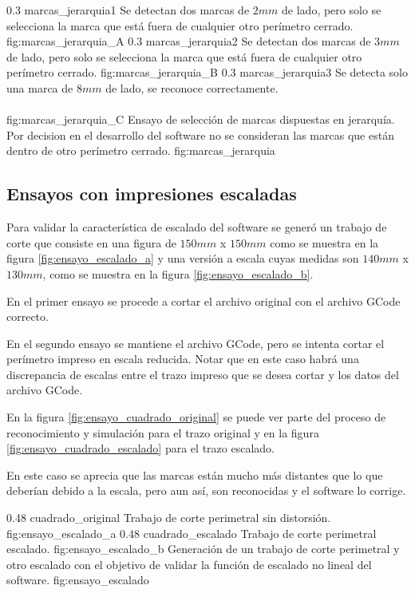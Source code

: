    \subfigabc
   {0.3} {marcas_jerarquia1} {Se detectan dos marcas de $2 mm$ de lado, pero solo se selecciona la marca que está fuera de cualquier otro perímetro cerrado.} {fig:marcas_jerarquia_A}
   {0.3} {marcas_jerarquia2} {Se detectan dos marcas de $3 mm$ de lado, pero solo se selecciona la marca que está fuera de cualquier otro perímetro cerrado.} {fig:marcas_jerarquia_B}
   {0.3} {marcas_jerarquia3} {Se detecta solo una marca de $8 mm$ de lado, se reconoce correctamente.\\ \vphantom{1}\\ \vphantom{1}} {fig:marcas_jerarquia_C}
   {Ensayo de selección de marcas dispuestas en jerarquía. Por decision en el desarrollo del software no se consideran las marcas que están dentro de otro perímetro cerrado.}
   {fig:marcas_jerarquia}

\subsection{Ensayos con impresiones escaladas}

Para validar la característica de escalado del software se generó un trabajo de corte que consiste en una figura de $150 mm$ x $150 mm$ como se muestra en la figura \ref{fig:ensayo_escalado_a} y una versión a escala cuyas medidas son $140 mm$ x $130 mm$, como se muestra en la figura \ref{fig:ensayo_escalado_b}.\par
   En el primer ensayo se procede a cortar el archivo original con el archivo GCode correcto. \par
   En el segundo ensayo se mantiene el archivo GCode, pero se intenta cortar el perímetro impreso en escala reducida. Notar que en este caso habrá una discrepancia de escalas entre el trazo impreso que se desea cortar y los datos del archivo GCode.\par
   En la figura \ref{fig:ensayo_cuadrado_original} se puede ver parte del proceso de reconocimiento y simulación para el trazo original y en la figura \ref{fig:ensayo_cuadrado_escalado} para el trazo escalado.\par
   En este caso se aprecia que las marcas están mucho más distantes que lo que deberían debido a la escala, pero aun así, son reconocidas y el software lo corrige.

   \subfigab
   {0.48} {cuadrado_original} {Trabajo de corte perimetral sin distorsión.} {fig:ensayo_escalado_a}
   {0.48} {cuadrado_escalado} {Trabajo de corte perimetral escalado.} {fig:ensayo_escalado_b}
   {Generación de un trabajo de corte perimetral y otro escalado con el objetivo de validar la función de escalado no lineal del software. }
   {fig:ensayo_escalado}

